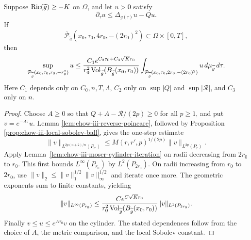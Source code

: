 \begin{theorem}
\label{thm:chow-iii-evolving-parabolic-mean-value}
Suppose \(\operatorname{Ric}(\widetilde g)\geq-K\) on \(\Omega\), and let \(u>0\)
satisfy
\[
 \partial_\tau u\leq\Delta_{g(\tau)}u-Qu.
\]
If
\[
 \overline{\mathcal P}_{\widetilde g}
 (x_0,\tau_0,4r_0,-(2r_0)^2)\subset\Omega\times[0,T],
\]
then
\[
 \sup_{\mathcal P_{\widetilde g}(x_0,\tau_0,r_0,-r_0^2)}u
 \leq
 \frac{C_1e^{C_2\tau_0+C_3\sqrt K r_0}}
 {r_0^2\Vol_{\widetilde g}(B_{\widetilde g}(x_0,r_0))}
 \int_{\mathcal P_{\widetilde g}(x_0,\tau_0,2r_0,-(2r_0)^2)}
 u\,d\mu_{\widetilde g}\,d\tau.
\]
Here \(C_1\) depends only on \(C_0,n,T,\Lambda\), \(C_2\) only on
\(\sup|Q|\) and \(\sup|\mathcal R|\), and \(C_3\) only on \(n\).
\end{theorem}
\begin{proof}
Choose \(A\geq0\) so that \(Q+A-\mathcal R/(2p)\geq0\) for all
\(p\geq1\), and put \(v=e^{-A\tau}u\).  Lemma
\ref{lem:chow-iii-reverse-poincare}, followed by Proposition
\ref{prop:chow-iii-local-sobolev-ball}, gives the one-step estimate
\[
 \|v\|_{L^{2p(n+2)/n}(P_{r'})}
 \leq M(r,r',p)^{1/(2p)}\|v\|_{L^{2p}(P_r)}.
\]
Apply Lemma~\ref{lem:chow-iii-moser-cylinder-iteration} on radii decreasing
from \(2r_0\) to \(r_0\).  This first bounds \(L^\infty(P_{r_0})\) by
\(L^2(P_{2r_0})\).  On radii increasing from \(r_0\) to \(2r_0\), use
\(\|v\|_2\leq\|v\|_1^{1/2}\|v\|_\infty^{1/2}\) and iterate once more.
The geometric exponents sum to finite constants, yielding
\[
 \|v\|_{L^\infty(P_{r_0})}
 \leq \frac{C e^{C\sqrt K r_0}}
 {r_0^2\operatorname{Vol}_{\widetilde g}(B_{\widetilde g}(x_0,r_0))}
 \|v\|_{L^1(P_{2r_0})}.
\]
Finally \(v\leq u\leq e^{A\tau_0}v\) on the cylinder.  The stated
dependences follow from the choice of \(A\), the metric comparison, and the
local Sobolev constant.
\end{proof}


